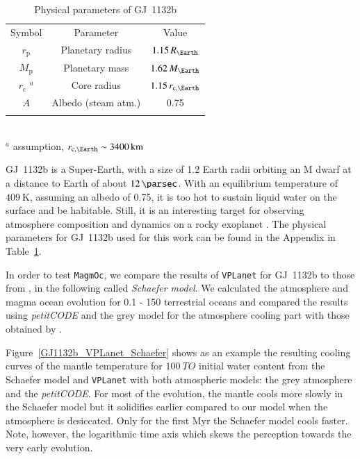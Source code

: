 \documentclass[oneside,twocolumn]{article}
\newcommand{\vplanet}{\texttt{\footnotesize{VPLanet}}}
\newcommand{\magmoc}{\texttt{\footnotesize{MagmOc}}}
\newcommand{\petit}{\textit{petitCODE}}
\begin{document}
\begin{table}[ht]
	\caption[Parameters GJ~1132b]{Physical parameters of GJ~1132b \citep{Bonfils2018}}
	\begin{tabular}{ccc}
		\noalign{\smallskip}
		\hline
		\noalign{\smallskip}
		Symbol & Parameter & Value \\ 
		\noalign{\smallskip}
		\hline \hline
		\noalign{\smallskip}
		$r_\mathrm{p} $ & Planetary radius & $1.15 \, R_\Earth$ \\
		$M_\mathrm{p} $ & Planetary mass  & $1.62 \, M_\Earth$ \\
		$r_\mathrm{c}$ $^a$ & Core radius & $1.15 \, r_{\mathrm{c},\Earth}$ \\
		$A$ & Albedo (steam atm.)& 0.75 \\
		\noalign{\smallskip}
		\hline
	\end{tabular}
	\\
	$^a$ assumption, $r_{\mathrm{c},\Earth} \sim \SI{3400}{\kilo\metre}$
	\label{Tab_Param_GJ1132b}
\end{table}

GJ~1132b is a Super-Earth, with a size of 1.2 Earth radii orbiting an M dwarf at a distance to Earth of about $\SI{12}{\parsec}$.
With an equilibrium temperature of $\SI{409}{\kelvin}$, assuming an albedo of 0.75, it is too hot to sustain liquid water on the surface and be habitable.
Still, it is an interesting target for observing atmosphere composition and dynamics on a rocky exoplanet \citep{Berta-Thompson2015}.
The physical parameters for GJ~1132b used for this work can be found in the Appendix in Table~\ref{Tab_Param_GJ1132b}.

In order to test \magmoc{}, we compare the results of \vplanet{} for GJ~1132b to those from \citet{Schaefer2016}, in the following called \textit{Schaefer model}. We calculated the atmosphere and magma ocean evolution for 0.1 - 150 terrestrial oceans and compared the results using \petit{} \citep{Molliere2015, Molliere2017} and the grey model \citep{Elkins-Tanton2008, Carone2014} for the atmosphere cooling part with those obtained by \citet{Schaefer2016}.

Figure~\ref{GJ1132b_VPLanet_Schaefer} shows as an example the resulting cooling curves of the mantle temperature for $\SI{100}{TO}$ initial water content from the Schaefer model and \vplanet{} with both atmospheric models: the grey atmosphere and the \petit{}. For most of the evolution, the mantle cools more slowly in the Schaefer model but it solidifies earlier compared to our model when the atmosphere is desiccated. Only for the first Myr the Schaefer model cools faster. Note, however, the logarithmic time axis which skews the perception towards the very early evolution.
\end{document}
